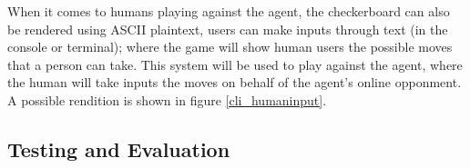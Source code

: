 \documentclass[12pt,a4paper]{article}
\newcommand{\bl}{\node [ball, ball color=black]{};}
\newcommand{\wh}{\node [ball, ball color=white] {};}
\begin{document}
    When it comes to humans playing against the agent, the checkerboard can also be rendered using ASCII plaintext, users can make inputs through text (in the console or terminal); where the game will show human users the possible moves that a person can take. This system will be used to play against the agent, where the human will take inputs the moves on behalf of the agent's online opponment. A possible rendition is shown in figure \ref{cli_humaninput}.

\subsection*{Testing and Evaluation}



\begin{figure}
    \fontsize{16}{2}

    \centering

  
\end{figure}
\end{document}

